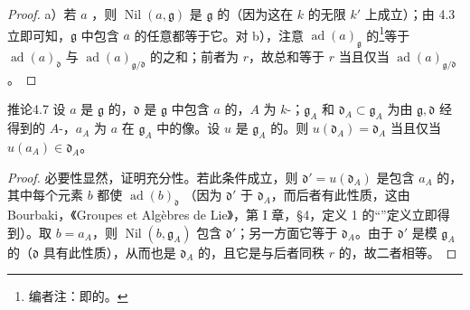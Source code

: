 \begin{proof}
a）若 $a$ ，则 $\operatorname{Nil}(a,\mathfrak g)$ 是 $\mathfrak g$ 的（因为这在 $k$ 的无限 $k'$ 上成立）；由 4.3 立即可知，$\mathfrak g$ 中包含 $a$ 的任意都等于它。对 b），注意 $\operatorname{ad}(a)_{\mathfrak g}$ 的\footnote{编者注：即的。}等于 $\operatorname{ad}(a)_{\mathfrak d}$ 与 $\operatorname{ad}(a)_{\mathfrak g/\mathfrak d}$ 的之和；前者为 $r$，故总和等于 $r$ 当且仅当 $\operatorname{ad}(a)_{\mathfrak g/\mathfrak d}$ 。
\end{proof}
\begin{SGAresult}{推论}{4.7}
设 $a$ 是 $\mathfrak g$ 的，$\mathfrak d$ 是 $\mathfrak g$ 中包含 $a$ 的，$A$ 为 $k$-；$\mathfrak g_A$ 和 $\mathfrak d_A\subset\mathfrak g_A$ 为由 $\mathfrak g,\mathfrak d$ 经得到的 $A$-，$a_A$ 为 $a$ 在 $\mathfrak g_A$ 中的像。设 $u$ 是 $\mathfrak g_A$ 的。则 $u(\mathfrak d_A)=\mathfrak d_A$ 当且仅当 $u(a_A)\in\mathfrak d_A$。
\end{SGAresult}
\begin{proof}
必要性显然，证明充分性。若此条件成立，则 $\mathfrak d'=u(\mathfrak d_A)$ 是包含 $a_A$ 的，其中每个元素 $b$ 都使 $\operatorname{ad}(b)_{\mathfrak d}$ （因为 $\mathfrak d'$ 于 $\mathfrak d_A$，而后者有此性质，这由 Bourbaki，《Groupes et Algèbres de Lie》，第 I 章，\S 4，定义 1 的“”定义立即得到）。取 $b=a_A$，则 $\operatorname{Nil}(b,\mathfrak g_A)$ 包含 $\mathfrak d'$；另一方面它等于 $\mathfrak d_A$。由于 $\mathfrak d'$ 是模 $\mathfrak g_A$ 的（$\mathfrak d$ 具有此性质），从而也是 $\mathfrak d_A$ 的，且它是与后者同秩 $r$ 的，故二者相等。
\end{proof}
